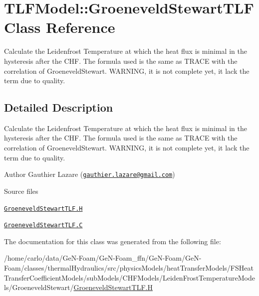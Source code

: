 \hypertarget{classFoam_1_1TLFModel_1_1GroeneveldStewartTLF}{}\section{T\+L\+F\+Model\+:\+:Groeneveld\+Stewart\+T\+LF Class Reference}
\label{classFoam_1_1TLFModel_1_1GroeneveldStewartTLF}


Calculate the Leidenfrost Temperature at which the heat flux is minimal in the hysteresis after the C\+HF. The formula used is the same as T\+R\+A\+CE with the correlation of Groeneveld\+Stewart. W\+A\+R\+N\+I\+NG, it is not complete yet, it lack the term due to quality.  




\subsection{Detailed Description}
Calculate the Leidenfrost Temperature at which the heat flux is minimal in the hysteresis after the C\+HF. The formula used is the same as T\+R\+A\+CE with the correlation of Groeneveld\+Stewart. W\+A\+R\+N\+I\+NG, it is not complete yet, it lack the term due to quality. 

\label{_Description}%
 Author Gauthier Lazare (\href{mailto:gauthier.lazare@gmail.com}{\tt gauthier.\+lazare@gmail.\+com})

\begin{DoxyParagraph}{Source files}

\begin{DoxyItemize}
\item \href{../../../home/carlo/data/GeN-Foam/GeN-Foam_ffn/GeN-Foam/GeN-Foam/classes/thermalHydraulics/src/physicsModels/heatTransferModels/FSHeatTransferCoefficientModels/subModels/CHFModels/LeidenFrostTemperatureModels/GroeneveldStewart/GroeneveldStewartTLF.H}{\tt Groeneveld\+Stewart\+T\+L\+F.\+H} 
\item \href{../../../home/carlo/data/GeN-Foam/GeN-Foam_ffn/GeN-Foam/GeN-Foam/classes/thermalHydraulics/src/physicsModels/heatTransferModels/FSHeatTransferCoefficientModels/subModels/CHFModels/LeidenFrostTemperatureModels/GroeneveldStewart/GroeneveldStewartTLF.C}{\tt Groeneveld\+Stewart\+T\+L\+F.\+C} 
\end{DoxyItemize}
\end{DoxyParagraph}


The documentation for this class was generated from the following file\+:\begin{DoxyCompactItemize}
\item 
/home/carlo/data/\+Ge\+N-\/\+Foam/\+Ge\+N-\/\+Foam\+\_\+ffn/\+Ge\+N-\/\+Foam/\+Ge\+N-\/\+Foam/classes/thermal\+Hydraulics/src/physics\+Models/heat\+Transfer\+Models/\+F\+S\+Heat\+Transfer\+Coefficient\+Models/sub\+Models/\+C\+H\+F\+Models/\+Leiden\+Frost\+Temperature\+Models/\+Groeneveld\+Stewart/\hyperlink{GroeneveldStewartTLF_8H}{Groeneveld\+Stewart\+T\+L\+F.\+H}\end{DoxyCompactItemize}
